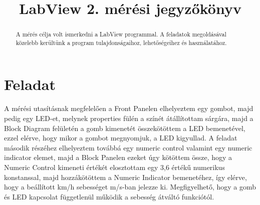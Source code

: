 \documentclass[10pt, conference,a4paper]{ITKproc}
\begin{document}
\title{LabView 2. mérési jegyzőkönyv}
\author{
}


\maketitle

\begin{abstract}
A mérés célja volt ismerkedni a LabView programmal. A feladatok megoldásával közelebb kerültünk a program tulajdonságaihoz, lehetőségeihez és használatához.
\end{abstract}

\IEEEpeerreviewmaketitle
\section{Feladat}
A mérési utasításnak megfelelően a Front Panelen elhelyeztem egy gombot, majd pedig egy LED-et, melynek properties fülén a színét átállítottam sárgára, majd a Block Diagram felületén a gomb kimenetét összekötöttem a LED bemenetével, ezzel elérve, hogy mikor a gombot megnyomjuk, a LED kigyullad. A feladat második részéhez elhelyeztem továbbá egy numeric control valamint egy numeric indicator elemet, majd a Block Panelen ezeket úgy kötöttem össze, hogy a Numeric Control kimeneti értékét elosztottam egy 3,6 értékű numerikus konstanssal, majd hozzákötöttem a Numeric Indicator bemenetéhez, így elérve, hogy a beállított km/h sebességet m/s-ban jelezze ki. Megfigyelhető, hogy a gomb és LED kapcsolat függetlenül működik a sebesség átváltó funkciótól. 
\end{document}
